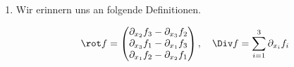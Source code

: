 \begin{solution}

\phantom{}

\begin{enumerate}[label = (\roman*)]

    \item Wir erinnern uns an folgende Definitionen.
    
    \begin{align*}
        \rot f
        =
        \begin{pmatrix}
            \partial_{x_2} f_3 - \partial_{x_3} f_2 \\
            \partial_{x_3} f_1 - \partial_{x_1} f_3 \\
            \partial_{x_1} f_2 - \partial_{x_2} f_1
        \end{pmatrix},
        \quad
        \Div f
        =
        \sum_{i=1}^3
        \partial_{x_i} f_i
    \end{align*}


\end{enumerate}
\end{solution}
